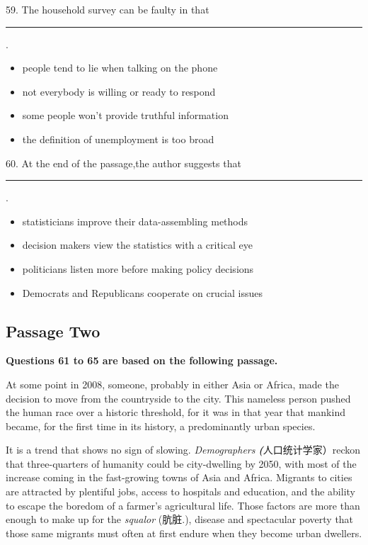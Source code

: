 \documentclass[UTF8,11pt]{ctexart}
\begin{document}
59. The household survey can be faulty in that\par\noindent\rule{.95\linewidth}{.4pt}\par  .


\begin{itemize}[leftmargin=2em,itemsep=.2em,topsep=.4em]\item[A.] people tend to lie when talking on the phone
\item[B.] not everybody is willing or ready to respond
\item[C.] some people won’t provide truthful information
\item[D.] the definition of unemployment is too broad
\end{itemize}

60. At the end of the passage,the author suggests that\par\noindent\rule{.95\linewidth}{.4pt}\par  .


\begin{itemize}[leftmargin=2em,itemsep=.2em,topsep=.4em]\item[A.] statisticians improve their data-assembling methods
\end{itemize}

\begin{itemize}[leftmargin=2em,itemsep=.2em,topsep=.4em]\item[B.] decision makers view the statistics with a critical eye
\item[C.] politicians listen more before making policy decisions
\item[D.] Democrats and Republicans cooperate on crucial issues
\end{itemize}

\subsection*{\textbf{Passage Two}}


\textbf{Questions 61 to 65 are based on the following passage.}


At some point in 2008, someone, probably in either Asia or Africa, made the decision to move from the countryside to the city. This nameless person pushed the human race over a historic threshold, for it was in that year that mankind became, for the first time in its history, a predominantly urban species.


It is a trend that shows no sign of slowing.\textit{ Demographers}\textbf{\textit{ (}}人口统计学家）reckon that three-quarters of humanity could be city-dwelling by 2050, with most of the increase coming in the fast-growing towns of Asia and Africa. Migrants to cities are attracted by plentiful jobs, access to hospitals and education, and the ability to escape the boredom of a farmer’s agricultural life. Those factors are more than enough to make up for the\textit{ squalor} (肮脏.), disease and spectacular poverty that those same migrants must often at first endure when they become urban dwellers.
\end{document}
